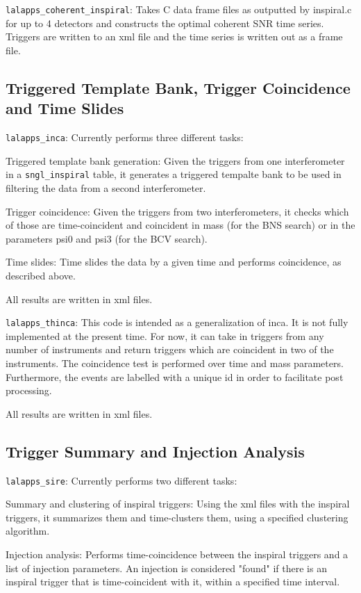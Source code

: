 \texttt{lalapps\_coherent\_inspiral}: Takes C data frame files as 
outputted by inspiral.c for up to 4 detectors and constructs the optimal 
coherent SNR time series.  Triggers are written to an xml file and the time 
series is written out as a frame file.

\subsection{Triggered Template Bank, Trigger Coincidence and Time Slides}

\texttt{lalapps\_inca}: Currently performs three different tasks:

Triggered template bank generation: Given the triggers from one interferometer
in a \verb$sngl_inspiral$ table, it generates a triggered tempalte bank to be
used in filtering the data from a second interferometer. 

Trigger coincidence: Given the triggers from two interferometers, it checks
which of those are time-coincident and coincident in mass (for the BNS search)
or in the parameters psi0 and psi3 (for the BCV search).

Time slides: Time slides the data by a given time and performs coincidence,
as described above.

All results are written in xml files.

\texttt{lalapps\_thinca}: This code is intended as a generalization of inca.  It
is not fully implemented at the present time.  For now, it can take in triggers
from any number of instruments and return triggers which are coincident in two
of the instruments.  The coincidence test is performed over time and mass
parameters.  Furthermore, the events are labelled with a unique id in order to
facilitate post processing.  

All results are written in xml files.


\subsection{Trigger Summary and Injection Analysis}

\texttt{lalapps\_sire}: Currently performs two different tasks:

Summary and clustering of inspiral triggers: Using the xml files with the
inspiral triggers, it summarizes them and time-clusters them, using a
specified clustering algorithm.

Injection analysis: Performs time-coincidence between  the inspiral triggers 
and a list of injection parameters. An injection is considered "found" if
there is an inspiral trigger that is time-coincident with it, within a 
specified time interval.


